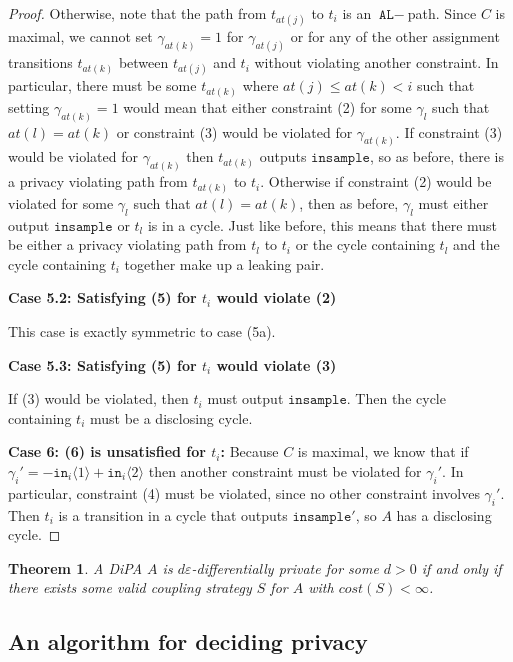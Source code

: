 \documentclass[12pt]{article}
\newcommand{\brangle}[1]{\langle #1 \rangle}
\newtheorem{thm}{Theorem}[section]
\theoremstyle{definition}
\begin{document}
\begin{proof}
    Otherwise, note that the path from $t_{at(j)}$ to $t_i$ is an $\texttt{AL}-$path. Since $C$ is maximal, we cannot set $\gamma_{at(k)}=1$ for $\gamma_{at(j)}$ or for any of the other assignment transitions $t_{at(k)}$ between $t_{at(j)}$ and $t_i$ without violating another constraint. 
    In particular, there must be some $t_{at(k)}$ where $at(j)\leq at(k)<i$ such that setting $\gamma_{at(k)} = 1$ would mean that either constraint (2) for some $\gamma_l$ such that $at(l) = at(k)$ or constraint (3) would be violated for $\gamma_{at(k)}$. 
    If constraint (3) would be violated for $\gamma_{at(k)}$ then $t_{at(k)}$ outputs $\texttt{insample}$, so as before, there is a privacy violating path from $t_{at(k)}$ to $t_i$. Otherwise if constraint (2) would be violated for some $\gamma_l$ such that $at(l) = at(k)$, then as before, $\gamma_l$ must either output $\texttt{insample}$ or $t_l$ is in a cycle. 
    Just like before, this means that there must be either a privacy violating path from $t_l$ to $t_i$ or the cycle containing $t_l$ and the cycle containing $t_i$ together make up a leaking pair. 

    \textbf{Case 5.2: Satisfying (5) for $t_i$ would violate (2)}

    This case is exactly symmetric to case (5a).

    \textbf{Case 5.3: Satisfying (5) for $t_i$ would violate (3)}

    If (3) would be violated, then $t_i$ must output $\texttt{insample}$. Then the cycle containing $t_i$ must be a disclosing cycle. 
    
    \textbf{Case 6: (6) is unsatisfied for $t_i$:} Because $C$ is maximal, we know that if $\gamma_i' = -\texttt{in}_i\brangle{1}+\texttt{in}_i\brangle{2}$ then another constraint must be violated for $\gamma_i'$. In particular, constraint (4) must be violated, since no other constraint involves $\gamma_i'$. 
    Then $t_i$ is a transition in a cycle that outputs $\texttt{insample}'$, so $A$ has a disclosing cycle.
\end{proof}


\begin{thm}
    A DiPA $A$ is $d\varepsilon$-differentially private for some $d>0$ if and only if there exists some valid coupling strategy $S$ for $A$ with $cost(S)<\infty$. 
\end{thm}

\subsection{An algorithm for deciding privacy}
\end{document}
